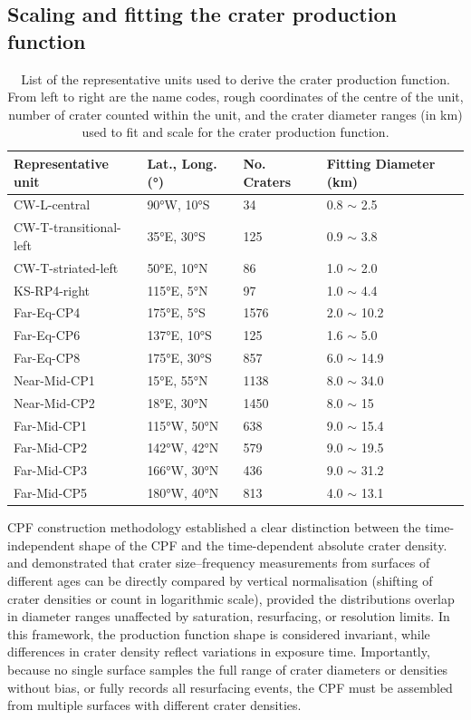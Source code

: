\documentclass[preprint,11pt,3p,times,authoryear]{elsarticle}
\begin{document}
\subsection{Scaling and fitting the crater production function}
\begin{table}[t]
\centering
    \begin{tabular}{p{4.0cm} p{3.0cm} p{2.0cm} p{3.0cm}}
\hline
\textbf{Representative unit} & \textbf{Lat., Long. (°)} & \textbf{No. Craters} & \textbf{Fitting Diameter (km)} \\
\hline
CW-L-central & 90°W, 10°S & 34 & 0.8 $\sim$ 2.5 \\
CW-T-transitional-left & 35°E, 30°S & 125 & 0.9 $\sim$ 3.8 \\
CW-T-striated-left & 50°E, 10°N & 86 & 1.0 $\sim$ 2.0 \\
KS-RP4-right & 115°E, 5°N & 97 & 1.0 $\sim$ 4.4 \\
Far-Eq-CP4 & 175°E, 5°S & 1576 & 2.0 $\sim$ 10.2\\
Far-Eq-CP6 & 137°E, 10°S & 125 & 1.6 $\sim$ 5.0 \\
Far-Eq-CP8 & 175°E, 30°S & 857 & 6.0 $\sim$ 14.9 \\
Near-Mid-CP1 & 15°E, 55°N & 1138 & 8.0 $\sim$ 34.0 \\
Near-Mid-CP2 & 18°E, 30°N & 1450 & 8.0 $\sim$ 15 \\
Far-Mid-CP1 & 115°W, 50°N & 638 & 9.0 $\sim$ 15.4 \\
Far-Mid-CP2 & 142°W, 42°N & 579 & 9.0 $\sim$ 19.5 \\
Far-Mid-CP3 & 166°W, 30°N & 436 & 9.0 $\sim$ 31.2 \\
Far-Mid-CP5 & 180°W, 40°N & 813 & 4.0 $\sim$ 13.1 \\
\hline
\end{tabular}
\caption{List of the representative units used to derive the crater production function. From left to right are the name codes, rough coordinates of the centre of the unit, number of crater counted within the unit, and the crater diameter ranges (in km) used to fit and scale for the crater production function.}
\label{tab:representative_units}
\end{table}

CPF construction methodology established a clear distinction between the time-independent shape of the CPF and the time-dependent absolute crater density. \citet{Neukum2001} and \citet{Ivanov2001} demonstrated that crater size–frequency measurements from surfaces of different ages can be directly compared by vertical normalisation (shifting of crater densities or count in logarithmic scale), provided the distributions overlap in diameter ranges unaffected by saturation, resurfacing, or resolution limits. In this framework, the production function shape is considered invariant, while differences in crater density reflect variations in exposure time. Importantly, because no single surface samples the full range of crater diameters or densities without bias, or fully records all resurfacing events, the CPF must be assembled from multiple surfaces with different crater densities.\\
\end{document}
